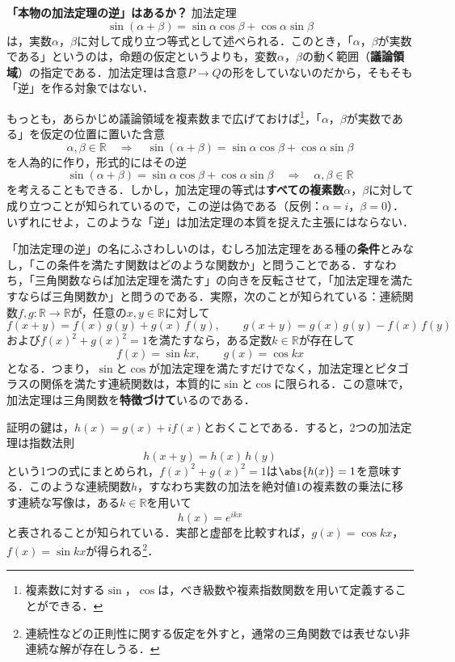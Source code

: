 \begin{mycolumn}
  \textbf{「本物の加法定理の逆」はあるか？}\quad
  加法定理
  \[
    \sin (\alpha + \beta) = \sin \alpha \cos \beta + \cos \alpha \sin \beta
  \]
  は，実数$\alpha$，$\beta$に対して成り立つ等式として述べられる．このとき，「$\alpha$，$\beta$が実数である」というのは，命題の仮定というよりも，変数$\alpha$，$\beta$の動く範囲（\textbf{議論領域}）の指定である．加法定理は含意$P \to Q$の形をしていないのだから，そもそも「逆」を作る対象ではない．

  もっとも，あらかじめ議論領域を複素数まで広げておけば\footnote{複素数に対する$\sin$，$\cos$は，べき級数や複素指数関数を用いて定義することができる．}，「$\alpha$，$\beta$が実数である」を仮定の位置に置いた含意
  \[
    \alpha, \beta \in \mathbb{R}
    \quad \Longrightarrow \quad
    \sin (\alpha + \beta) = \sin \alpha \cos \beta + \cos \alpha \sin \beta
  \]
  を人為的に作り，形式的にはその逆
  \[
    \sin (\alpha + \beta) = \sin \alpha \cos \beta + \cos \alpha \sin \beta
    \quad \Longrightarrow \quad
    \alpha, \beta \in \mathbb{R}
  \]
  を考えることもできる．しかし，加法定理の等式は\textbf{すべての複素数}$\alpha$，$\beta$に対して成り立つことが知られているので，この逆は偽である（反例：$\alpha = i$，$\beta = 0$）．いずれにせよ，このような「逆」は加法定理の本質を捉えた主張にはならない．

  「加法定理の逆」の名にふさわしいのは，むしろ加法定理をある種の\textbf{条件}とみなし，「この条件を満たす関数はどのような関数か」と問うことである．すなわち，「三角関数ならば加法定理を満たす」の向きを反転させて，「加法定理を満たすならば三角関数か」と問うのである．実際，次のことが知られている：連続関数$f, g \colon \mathbb{R} \to \mathbb{R}$が，任意の$x, y \in \mathbb{R}$に対して
  \[
    f(x + y) = f(x)\, g(y) + g(x)\, f(y),
    \qquad
    g(x + y) = g(x)\, g(y) - f(x)\, f(y)
  \]
  および$f(x)^2 + g(x)^2 = 1$を満たすなら，ある定数$k \in \mathbb{R}$が存在して
  \[
    f(x) = \sin kx,
    \qquad
    g(x) = \cos kx
  \]
  となる．つまり，$\sin$と$\cos$が加法定理を満たすだけでなく，加法定理とピタゴラスの関係を満たす連続関数は，本質的に$\sin$と$\cos$に限られる．この意味で，加法定理は三角関数を\textbf{特徴づけて}いるのである．

  証明の鍵は，$h(x) = g(x) + i f(x)$とおくことである．すると，2つの加法定理は指数法則
  \[
    h(x + y) = h(x)\, h(y)
  \]
  という1つの式にまとめられ，$f(x)^2 + g(x)^2 = 1$は$\abs{h(x)} = 1$を意味する．このような連続関数$h$，すなわち実数の加法を絶対値$1$の複素数の乗法に移す連続な写像は，ある$k \in \mathbb{R}$を用いて
  \[
    h(x) = e^{ikx}
  \]
  と表されることが知られている．実部と虚部を比較すれば，$g(x) = \cos kx$，$f(x) = \sin kx$が得られる\footnote{連続性などの正則性に関する仮定を外すと，通常の三角関数では表せない非連続な解が存在しうる．}．
\end{mycolumn}

